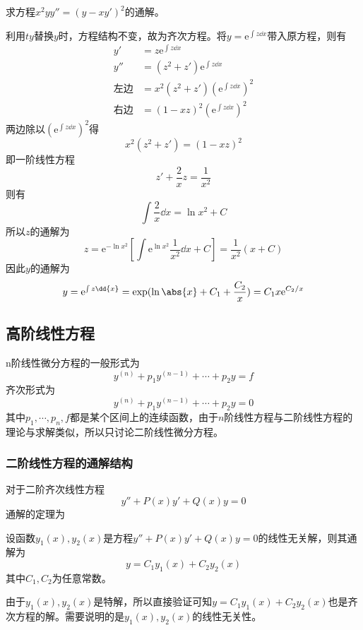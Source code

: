 \begin{example}
    求方程$x^2yy''=(y-xy')^2$的通解。
\end{example}
\begin{solution}
    利用$ty$替换$y$时，方程结构不变，故为齐次方程。将$y=\mathrm{e}^{\int z\dd{x}}$带入原方程，则有
    \begin{align*}
        y'          & = z\mathrm{e}^{\int z\dd{x}}                          \\
        y''         & = (z^2+z')\mathrm{e}^{\int z\dd{x}}                   \\
        \text{左边} & = x^2(z^2+z')\left(\mathrm{e}^{\int z\dd{x}}\right)^2 \\
        \text{右边} & = (1-xz)^2\left(\mathrm{e}^{\int z\dd{x}}\right)^2
    \end{align*}
    两边除以$\left(\mathrm{e}^{\int z\dd{x}}\right)^2$得
    \[ x^2(z^2+z') = (1-xz)^2 \]
    即一阶线性方程
    \[ z' + \frac{2}{x}z = \frac{1}{x^2} \]
    则有
    \[ \int \frac{2}{x}\dd{x} = \ln{x^2} + C \]
    所以$z$的通解为
    \[
        z =\mathrm{e}^{-\ln{x^2}}\left[\int \mathrm{e}^{\ln{x^2}} \frac{1}{x^2}\dd{x} + C \right]
        =\frac{1}{x^2}(x + C)
    \]
    因此$y$的通解为
    \[ y = \mathrm{e}^{\int z \dd{x}} = \exp(\ln\abs{x} + C_1 + \frac{C_2}{x}) = C_1x\mathrm{e}^{C_2/x} \]
\end{solution}

\subsection{高阶线性方程}
n阶线性微分方程的一般形式为
\[ y^{(n)} + p_1y^{(n-1)} + \cdots + p_2y = f \]
齐次形式为
\[ y^{(n)} + p_1y^{(n-1)} + \cdots + p_2y = 0 \]
其中$p_1,\cdots,p_n,f$都是某个区间上的连续函数，由于$n$阶线性方程与二阶线性方程的理论与求解类似，所以只讨论二阶线性微分方程。
\subsubsection{二阶线性方程的通解结构}
对于二阶齐次线性方程
\[ y'' + P(x)y' + Q(x)y = 0 \]
通解的定理为
\begin{theorem}
    设函数$y_1(x),y_2(x)$是方程$y''+P(x)y'+Q(x)y=0$的线性无关解，则其通解为
    \[ y = C_1y_1(x) + C_2y_2(x) \]
    其中$C_1,C_2$为任意常数。
\end{theorem}

由于$y_1(x),y_2(x)$是特解，所以直接验证可知$y = C_1y_1(x) + C_2y_2(x)$也是齐次方程的解。需要说明的是$y_1(x),y_2(x)$的线性无关性。

